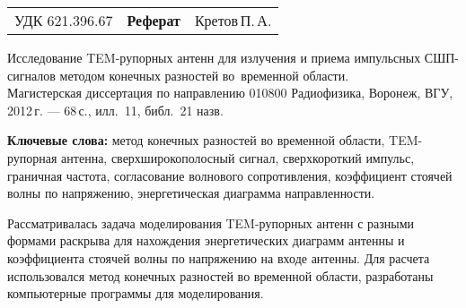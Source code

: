 
\noindent
{
\begin{tabularx}{\textwidth}{lCr}
УДК 621.396.67 & \textbf{Реферат} & Кретов\,П.\,А.
\end{tabularx}}
\vspace{10mm}

\noindent
Исследование TEM-рупорных антенн для излучения и приема импульсных СШП-сигналов
методом конечных разностей во~временной области.\\
Магистерская диссертация по направлению 010800 Радиофизика, Воронеж, ВГУ, 2012\,г.
--- 68\,с., илл.~11, библ.~21 назв.

\vspace{10mm}

\noindent
\textbf{Ключевые слова:}
    метод конечных разностей во временной области,
    TEM-рупорная антенна,
    сверхширокополосный сигнал,
    сверхкороткий импульс,
    граничная частота,
    согласование волнового сопротивления,
    коэффициент стоячей волны по напряжению,
    энергетическая диаграмма направленности.

\vspace{10mm}
\noindent
Рассматривалась задача моделирования TEM-рупорных антенн с разными формами
раскрыва для нахождения энергетических диаграмм антенны и коэффициента стоячей
волны по напряжению на входе антенны. Для расчета использовался метод конечных
разностей во временной области, разработаны компьютерные программы для
моделирования.
\clearpage
